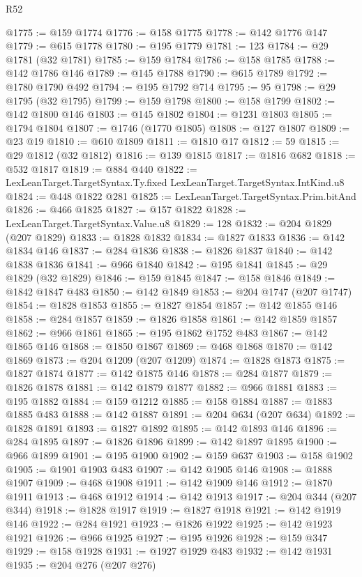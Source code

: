 \begin{lexlean}{R52}
\begin{coremodule}
@1775 := @159 @1774
@1776 := @158 @1775
@1778 := @142 @1776 @147
@1779 := @615 @1778
@1780 := @195 @1779
@1781 := 123
@1784 := @29 @1781 (@32 @1781)
@1785 := @159 @1784
@1786 := @158 @1785
@1788 := @142 @1786 @146
@1789 := @145 @1788
@1790 := @615 @1789
@1792 := @1780 @1790 @492
@1794 := @195 @1792 @714
@1795 := 95
@1798 := @29 @1795 (@32 @1795)
@1799 := @159 @1798
@1800 := @158 @1799
@1802 := @142 @1800 @146
@1803 := @145 @1802
@1804 := @1231 @1803
@1805 := @1794 @1804
@1807 := @1746 (@1770 @1805)
@1808 := @127 @1807
@1809 := @23 @19
@1810 := @610 @1809
@1811 := @1810 @17
@1812 := 59
@1815 := @29 @1812 (@32 @1812)
@1816 := @139 @1815
@1817 := @1816 @682
@1818 := @532 @1817
@1819 := @884 @440
@1822 := LexLeanTarget.TargetSyntax.Ty.fixed LexLeanTarget.TargetSyntax.IntKind.u8
@1824 := @448 @1822 @281
@1825 := LexLeanTarget.TargetSyntax.Prim.bitAnd
@1826 := @466 @1825
@1827 := @157 @1822
@1828 := LexLeanTarget.TargetSyntax.Value.u8
@1829 := 128
@1832 := @204 @1829 (@207 @1829)
@1833 := @1828 @1832
@1834 := @1827 @1833
@1836 := @142 @1834 @146
@1837 := @284 @1836
@1838 := @1826 @1837
@1840 := @142 @1838 @1836
@1841 := @966 @1840
@1842 := @195 @1841
@1845 := @29 @1829 (@32 @1829)
@1846 := @159 @1845
@1847 := @158 @1846
@1849 := @1842 @1847 @483
@1850 := @142 @1849
@1853 := @204 @1747 (@207 @1747)
@1854 := @1828 @1853
@1855 := @1827 @1854
@1857 := @142 @1855 @146
@1858 := @284 @1857
@1859 := @1826 @1858
@1861 := @142 @1859 @1857
@1862 := @966 @1861
@1865 := @195 @1862 @1752 @483
@1867 := @142 @1865 @146
@1868 := @1850 @1867
@1869 := @468 @1868
@1870 := @142 @1869
@1873 := @204 @1209 (@207 @1209)
@1874 := @1828 @1873
@1875 := @1827 @1874
@1877 := @142 @1875 @146
@1878 := @284 @1877
@1879 := @1826 @1878
@1881 := @142 @1879 @1877
@1882 := @966 @1881
@1883 := @195 @1882
@1884 := @159 @1212
@1885 := @158 @1884
@1887 := @1883 @1885 @483
@1888 := @142 @1887
@1891 := @204 @634 (@207 @634)
@1892 := @1828 @1891
@1893 := @1827 @1892
@1895 := @142 @1893 @146
@1896 := @284 @1895
@1897 := @1826 @1896
@1899 := @142 @1897 @1895
@1900 := @966 @1899
@1901 := @195 @1900
@1902 := @159 @637
@1903 := @158 @1902
@1905 := @1901 @1903 @483
@1907 := @142 @1905 @146
@1908 := @1888 @1907
@1909 := @468 @1908
@1911 := @142 @1909 @146
@1912 := @1870 @1911
@1913 := @468 @1912
@1914 := @142 @1913
@1917 := @204 @344 (@207 @344)
@1918 := @1828 @1917
@1919 := @1827 @1918
@1921 := @142 @1919 @146
@1922 := @284 @1921
@1923 := @1826 @1922
@1925 := @142 @1923 @1921
@1926 := @966 @1925
@1927 := @195 @1926
@1928 := @159 @347
@1929 := @158 @1928
@1931 := @1927 @1929 @483
@1932 := @142 @1931
@1935 := @204 @276 (@207 @276)

\end{coremodule}
\end{lexlean}
